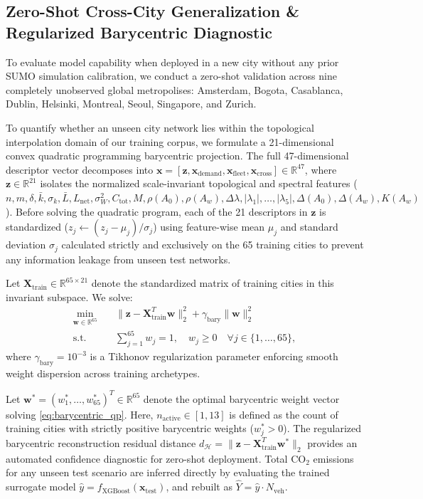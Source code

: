 \documentclass[journal]{IEEEtran}
\begin{document}
\subsection{Zero-Shot Cross-City Generalization \& Regularized Barycentric Diagnostic}
To evaluate model capability when deployed in a new city without any prior SUMO simulation calibration, we conduct a zero-shot validation across nine completely unobserved global metropolises: Amsterdam, Bogota, Casablanca, Dublin, Helsinki, Montreal, Seoul, Singapore, and Zurich.

To quantify whether an unseen city network lies within the topological interpolation domain of our training corpus, we formulate a 21-dimensional convex quadratic programming barycentric projection. The full 47-dimensional descriptor vector decomposes into $\mathbf{x} = [\mathbf{z}, \mathbf{x}_{\text{demand}}, \mathbf{x}_{\text{fleet}}, \mathbf{x}_{\text{cross}}] \in \mathbb{R}^{47}$, where $\mathbf{z} \in \mathbb{R}^{21}$ isolates the normalized scale-invariant topological and spectral features ($n, m, \delta, \bar{k}, \sigma_k, \bar{L}, L_{\text{net}}, \sigma_W^2, C_{\text{tot}}, M, \rho(A_0), \rho(A_w), \Delta\lambda, |\lambda_1|, \dots, |\lambda_5|, \Delta(A_0), \Delta(A_w), K(A_w)$). Before solving the quadratic program, each of the 21 descriptors in $\mathbf{z}$ is standardized ($z_j \leftarrow (z_j - \mu_j) / \sigma_j$) using feature-wise mean $\mu_j$ and standard deviation $\sigma_j$ calculated strictly and exclusively on the 65 training cities to prevent any information leakage from unseen test networks.

Let $\mathbf{X}_{\text{train}} \in \mathbb{R}^{65 \times 21}$ denote the standardized matrix of training cities in this invariant subspace. We solve:
\begin{equation}
\begin{aligned}
\min_{\mathbf{w} \in \mathbb{R}^{65}} \quad & \| \mathbf{z} - \mathbf{X}_{\text{train}}^T \mathbf{w} \|_2^2 + \gamma_{\text{bary}} \| \mathbf{w} \|_2^2 \\
\text{s.t.} \quad & \sum_{j=1}^{65} w_j = 1, \quad w_j \ge 0 \quad \forall j \in \{1, \dots, 65\},
\end{aligned}
\label{eq:barycentric_qp}
\end{equation}
where $\gamma_{\text{bary}} = 10^{-3}$ is a Tikhonov regularization parameter enforcing smooth weight dispersion across training archetypes.

Let $\mathbf{w}^* = (w_1^*, \dots, w_{65}^*)^T \in \mathbb{R}^{65}$ denote the optimal barycentric weight vector solving \eqref{eq:barycentric_qp}. Here, $n_{\text{active}} \in [1, 13]$ is defined as the count of training cities with strictly positive barycentric weights ($w_j^* > 0$). The regularized barycentric reconstruction residual distance $d_{\mathcal{H}} = \| \mathbf{z} - \mathbf{X}_{\text{train}}^T \mathbf{w}^* \|_2$ provides an automated confidence diagnostic for zero-shot deployment. Total $\text{CO}_2$ emissions for any unseen test scenario are inferred directly by evaluating the trained surrogate model $\hat{y} = f_{\text{XGBoost}}(\mathbf{x}_{\text{test}})$, and rebuilt as $\hat{Y} = \hat{y} \cdot N_{\text{veh}}$.
\end{document}
